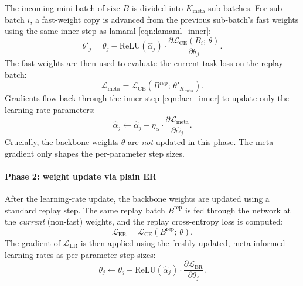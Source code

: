 The incoming mini-batch of size $B$ is divided into $K_\text{meta}$ sub-batches. For sub-batch $i$, a fast-weight copy is advanced from the previous sub-batch's fast weights using the same inner step as \gls{lamaml} \eqref{eqn:lamaml_inner}:
%
\begin{equation}\label{eqn:laer_inner}
    \theta'_j
    =
    \theta_j
    -
    \mathrm{ReLU}(\hat\alpha_j) \cdot
    \frac{\partial \mathcal{L}_\text{CE}(B_i;\,\theta)}
         {\partial \theta_j}.
\end{equation}
%
The fast weights are then used to evaluate the current-task loss on the replay batch:
%
\begin{equation}\label{eqn:laer_meta_loss}
    \mathcal{L}_\text{meta}
    =
    \mathcal{L}_\text{CE}\!\left(B^\text{rep};\, \theta'_{K_\text{meta}}\right).
\end{equation}
%
Gradients flow back through the inner step \eqref{eqn:laer_inner} to update only the learning-rate parameters:
%
\begin{equation}\label{eqn:laer_lr_update}
    \hat\alpha_j
    \leftarrow
    \hat\alpha_j
    -
    \eta_\alpha \cdot
    \frac{\partial \mathcal{L}_\text{meta}}{\partial \hat\alpha_j}.
\end{equation}
%
Crucially, the backbone weights $\theta$ are \emph{not} updated in this phase. The meta-gradient only shapes the per-parameter step sizes.

\paragraph{Phase 2: weight update via plain ER}

After the learning-rate update, the backbone weights are updated using a standard replay step. The same replay batch $B^\text{rep}$ is fed through the network at the \emph{current} (non-fast) weights, and the replay cross-entropy loss is computed:
%
\begin{equation}\label{eqn:laer_er_loss}
    \mathcal{L}_\text{ER}
    =
    \mathcal{L}_\text{CE}\!\left(B^\text{rep};\, \theta\right).
\end{equation}
%
The gradient of $\mathcal{L}_\text{ER}$ is then applied using the freshly-updated, meta-informed learning rates as per-parameter step sizes:
%
\begin{equation}\label{eqn:laer_weight_update}
    \theta_j
    \leftarrow
    \theta_j
    -
    \mathrm{ReLU}(\hat\alpha_j) \cdot
    \frac{\partial \mathcal{L}_\text{ER}}{\partial \theta_j}.
\end{equation}

